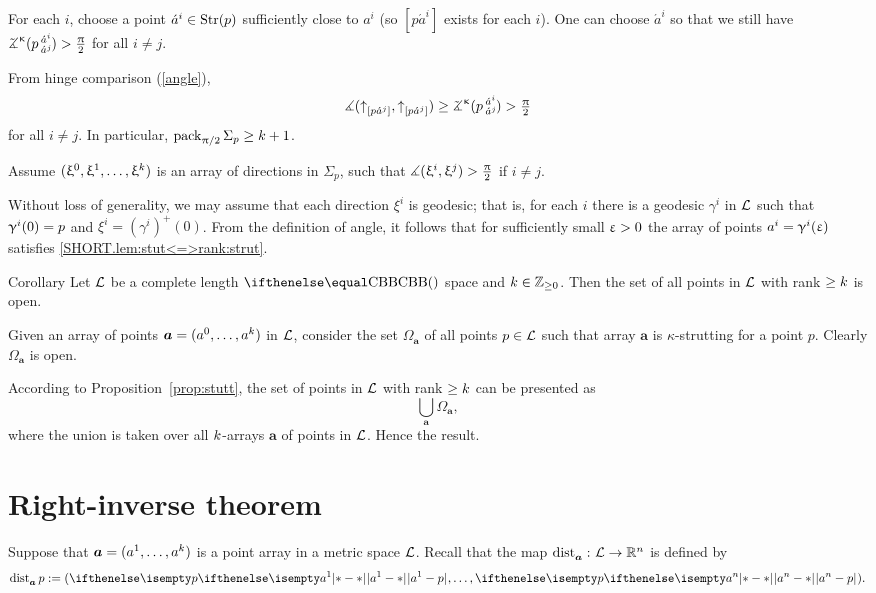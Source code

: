 For each $i$,
choose a point $\acute a^i\in\Str(p)$ sufficiently close to $a^i$ (so $[p\acute a^i]$ exists for each $i$).
One can choose $\acute a^i$ so that we still have
$\angk\kappa{p}{\acute a^i}{\acute a^j}>\tfrac\pi2$ for all $i\ne j$.

From hinge comparison (\ref{angle}),
\[\mangle(\dir{p}{\acute a^j},\dir{p}{\acute a^j})
\ge
\angk\kappa{p}{\acute a^i}{\acute a^j}
>
\tfrac\pi2\]
for all $i\ne j$.
In particular, $\pack_{\pi/2}\Sigma_p\ge \kay+1$.

Assume $(\xi^0,\xi^1,\dots,\xi^\kay)$ is an array of directions in $\Sigma_p$, such that $\measuredangle(\upxi^i,\upxi^j)>\tfrac{\uppi}2$ if $i\ne j$.

Without loss of generality, 
we may assume that each direction $\xi^i$ is geodesic;
that is, for each $i$ there is a geodesic $\gamma^i$ in $\mathcal{L}$ such that $\gamma^i(0)\z=p$ and $\xi^i=(\gamma^i)^+(0)$.
From the definition of angle, it follows that for sufficiently small $\upvarepsilon>0$ the array of points $a^i=\upgamma^i(\upvarepsilon)$ satisfies \ref{SHORT.lem:stut<=>rank:strut}.
\qeds

\begin{thm}{Corollary}\label{cor:rank>=k-open}
Let $\mathcal{L}$ be a complete length $\Alex{}$ space and $\kay\in\ZZ_{\ge0}$.
Then the set of all points in $\mathcal{L}$ 
with rank $\ge \kay$ is open.
\end{thm}

 Given an array of points $\bm{a}=(a^0,\dots,a^\kay)$ in $\mathcal{L}$, consider 
the set $\Omega_{\bm{a}}$ of all points $p\in \spc{L}$ such that array $\bm{a}$
 is $\kappa$-strutting for a point $p$.
Clearly $\Omega_{\bm{a}}$ is open.

According to Proposition~\ref{prop:stutt}, the set of points in $\mathcal{L}$ 
with rank $\ge \kay$ can be presented as
\[\bigcup_{\bm{a}}\Omega_{\bm{a}},\]
where the union is taken over all $k$-arrays $\bm{a}$ of points in $\mathcal{L}$.
Hence the result.
\qeds

\section{Right-inverse theorem}\label{sec:right-inverse-1}

Suppose that $\bm{a}=(a^1,\dots,a^\kay)$ is a point array in a metric space $\mathcal{L}$.
Recall that the map $\distfun{\bm{a}}{}{}\:\spc{L}\to\RR^n$ is defined by
\[\distfun{\bm{a}}{p}{}\df(\dist{a^1}{p}{},\dots,\dist{a^n}{p}{}).\] 

